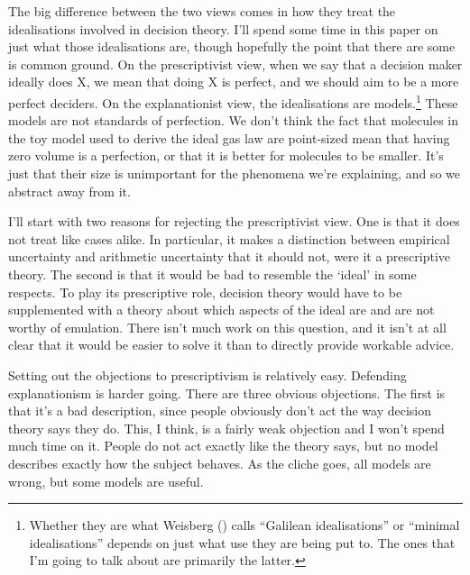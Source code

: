 \documentclass[
  11pt,
  letterpaper,
  DIV=11,
  numbers=noendperiod,
  twoside]{scrartcl}
\begin{document}
The big difference between the two views comes in how they treat the
idealisations involved in decision theory. I'll spend some time in this
paper on just what those idealisations are, though hopefully the point
that there are some is common ground. On the prescriptivist view, when
we say that a decision maker ideally does X, we mean that doing X is
perfect, and we should aim to be a more perfect deciders. On the
explanationist view, the idealisations are models.\footnote{Whether they
  are what Weisberg () calls ``Galilean
  idealisations'' or ``minimal idealisations'' depends on just what use
  they are being put to. The ones that I'm going to talk about are
  primarily the latter.} These models are not standards of perfection.
We don't think the fact that molecules in the toy model used to derive
the ideal gas law are point-sized mean that having zero volume is a
perfection, or that it is better for molecules to be smaller. It's just
that their size is unimportant for the phenomena we're explaining, and
so we abstract away from it.

I'll start with two reasons for rejecting the prescriptivist view. One
is that it does not treat like cases alike. In particular, it makes a
distinction between empirical uncertainty and arithmetic uncertainty
that it should not, were it a prescriptive theory. The second is that it
would be bad to resemble the `ideal' in some respects. To play its
prescriptive role, decision theory would have to be supplemented with a
theory about which aspects of the ideal are and are not worthy of
emulation. There isn't much work on this question, and it isn't at all
clear that it would be easier to solve it than to directly provide
workable advice.

Setting out the objections to prescriptivism is relatively easy.
Defending explanationism is harder going. There are three obvious
objections. The first is that it's a bad description, since people
obviously don't act the way decision theory says they do. This, I think,
is a fairly weak objection and I won't spend much time on it. People do
not act exactly like the theory says, but no model describes exactly how
the subject behaves. As the cliche goes, all models are wrong, but some
models are useful.
\end{document}
